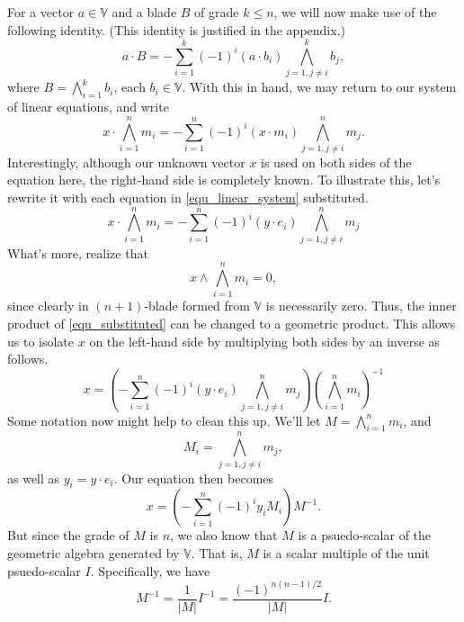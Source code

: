 \documentclass[12pt]{article}
\newcommand{\V}{\mathbb{V}}
\begin{document}
For a vector $a\in\V$ and a blade $B$ of grade $k\leq n$, we will now make use of the following identity.  (This identity is justified in the appendix.)
\begin{equation}\label{equ_useful_identity}
a\cdot B = -\sum_{i=1}^k(-1)^i (a\cdot b_i) \bigwedge_{j=1,j\neq i}^k b_j,
\end{equation}
where $B=\bigwedge_{i=1}^k b_i$, each $b_i\in\V$.  With this in hand, we may return to our
system of linear equations, and write
\begin{equation}
x\cdot\bigwedge_{i=1}^n m_i = -\sum_{i=1}^n (-1)^i (x\cdot m_i)\bigwedge_{j=1,j\neq i}^n m_j.
\end{equation}
Interestingly, although our unknown vector $x$ is used on both sides of the equation here, the right-hand side
is completely known.  To illustrate this, let's rewrite it with each equation in \eqref{equ_linear_system} substituted.
\begin{equation}\label{equ_substituted}
x\cdot\bigwedge_{i=1}^n m_i = -\sum_{i=1}^n (-1)^i (y\cdot e_i)\bigwedge_{j=1,j\neq i}^n m_j
\end{equation}
What's more, realize that
\begin{equation}
x\wedge\bigwedge_{i=1}^n m_i = 0,
\end{equation}
since clearly in $(n+1)$-blade formed from $\V$ is necessarily zero.  Thus, the inner product of \eqref{equ_substituted}
can be changed to a geometric product.  This allows us to isolate $x$ on the left-hand side by multiplying both sides
by an inverse as follows.
\begin{equation}
x = \left(-\sum_{i=1}^n (-1)^i (y\cdot e_i)\bigwedge_{j=1,j\neq i}^n m_j\right)\left(\bigwedge_{i=1}^n m_i\right)^{-1}
\end{equation}
Some notation now might help to clean this up.  We'll let $M=\bigwedge_{i=1}^n m_i$, and
\begin{equation}
M_i=\bigwedge_{j=1,j\neq i}^n m_j,
\end{equation}
as well as $y_i=y\cdot e_i$.  Our equation then becomes
\begin{equation}
x = \left(-\sum_{i=1}^n(-1)^i y_i M_i\right)M^{-1}.
\end{equation}
But since the grade of $M$ is $n$, we also know that $M$ is a psuedo-scalar of the geometric algebra generated by $\V$.
That is, $M$ is a scalar multiple of the unit psuedo-scalar $I$.  Specifically, we have
\begin{equation}
M^{-1} = \frac{1}{|M|}I^{-1} = \frac{(-1)^{n(n-1)/2}}{|M|}I.
\end{equation}
\end{document}
